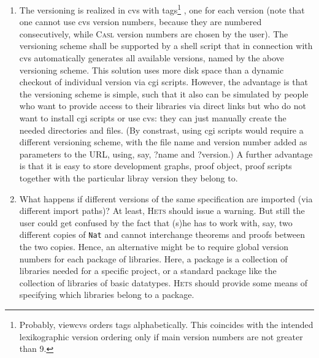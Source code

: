 \documentclass{article}
\newcommand{\CASL}{\textmd{\textsc{Casl}}\xspace }
\newcommand{\Hets}{\textmd{\textsc{Hets}}\xspace }
\begin{document}
\begin{enumerate}
\begin{quote}
   A CASL library is stored in a file ending ``.casl''. A directory having
   the same name (but without the ending) contains previously-defined
   versions of the library, various indexes, tool-generated information
   and perhaps other documentation.
\end{quote}

For files with a language-specific module mechanism, a language-specific
ending is chosen (e.g.\ ``.hs'' for Haskell).
For heterogeneous libraries, the ending is ``.het''\footnote{``.spec''
is already reserved for RPM specification files, and Emacs comes
with a standard mode for these.}, indicating that the needed
logic(s) have to specified within the library itself.

\item The versioning is realized in cvs with tags\footnote{Probably, viewcvs
orders tags alphabetically. This coincides with the intended lexikographic version
ordering only if main version numbers are not greater than 9.} , one for each version
(note that one cannot use cvs version numbers, because they are numbered
consecutively, while \CASL version numbers are chosen by the user).
The versioning scheme shall be supported by a shell script that in
connection with cvs automatically generates all available
versions, named by the above versioning scheme.
This solution uses more disk space than a dynamic checkout
of individual version via cgi scripts. However, the advantage
is that the versioning scheme is simple, such that it also
can be simulated by people who want to provide access to their
libraries via direct links but who do not want to install cgi
scripts or use cvs: they can just manually create the needed directories
and files. (By constrast, using cgi scripts would require
a different versioning scheme, with the file name and version
number added as parameters to the URL, using, say, ?name and ?version.)
A further advantage is that it is easy to store 
development graphs, proof object, proof scripts
together with the particular libray version they belong to.

\item What happens if different versions of the same specification
are imported (via different import paths)? At least, \Hets
should issue a warning. But still the user could get confused
by the fact that (s)he has to work with, say, two different
copies of \texttt{Nat} and cannot interchange theorems and proofs
between the two copies. Hence, an alternative might be to
require global version numbers for each package of libraries.
Here, a package is a collection of libraries needed for a specific
project, or a standard package like the collection of libraries
of basic datatypes.  \Hets should provide some means of
specifying which libraries belong to a package.


\end{enumerate}
\end{document}
